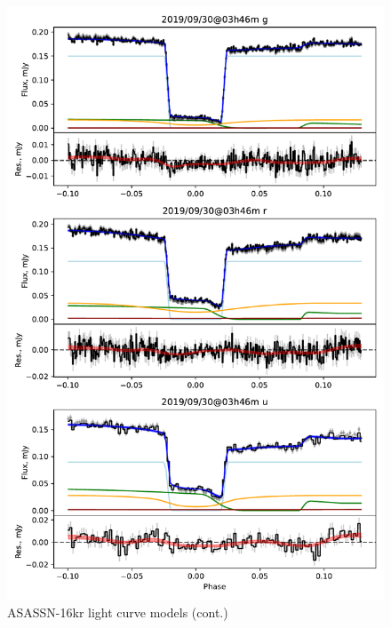 \begin{figure}
    \centering
    \includegraphics[width=\textwidth]{figures/results/three_cvs_with_weird_colours/ASASSN-16kr/ASASSN-16kr_7.pdf}
    \caption{ASASSN-16kr light curve models (cont.)}
    \label{fig:ASASSN-16kr all light curves cont 6}
\end{figure}
\clearpage


